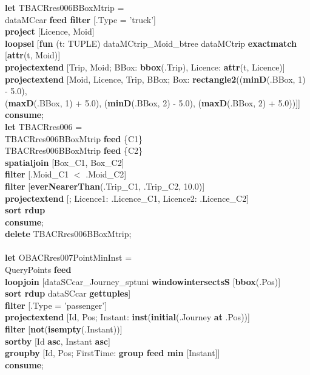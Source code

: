 \documentclass[a4paper]{article}
\newcommand{\op}[1]{\textbf{#1}}
\begin{document}
\begin{scriptsize}
\begin{tabbing}
\op{let} TBACRres006BBoxMtrip =\\
\>dataMCcar \op{feed filter} [.Type = 'truck']\\
\>\op{project} [Licence, Moid]\\
\>\op{loopsel} [\op{fun} (t: TUPLE) dataMCtrip\_Moid\_btree dataMCtrip \op{exactmatch} [\op{attr}(t, Moid)]\\
\>\>\op{projectextend} [Trip, Moid; BBox: \op{bbox}(.Trip), Licence: \op{attr}(t, Licence)]\\
\>\>\op{projectextend} [Moid, Licence, Trip, BBox; Box: \op{rectangle2}((\op{minD}(.BBox, 1) - 5.0),\\
\>\>\>\>(\op{maxD}(.BBox, 1) + 5.0), (\op{minD}(.BBox, 2) - 5.0), (\op{maxD}(.BBox, 2) + 5.0))]]\\
\op{consume};\\
\op{let} TBACRres006 =\\
\>TBACRres006BBoxMtrip \op{feed} \{C1\}\\
\>TBACRres006BBoxMtrip \op{feed} \{C2\}\\
\>\op{spatialjoin} [Box\_C1, Box\_C2]\\
\>\op{filter} [.Moid\_C1 $<$ .Moid\_C2]\\
\>\op{filter} [\op{everNearerThan}(.Trip\_C1, .Trip\_C2, 10.0)]\\
\>\op{projectextend} [; Licence1: .Licence\_C1, Licence2: .Licence\_C2]\\
\>\op{sort rdup}\\
\op{consume};\\
\op{delete} TBACRres006BBoxMtrip;\\
\\
\op{let} OBACRres007PointMinInst = \\
\>QueryPoints \op{feed}\\
\>\op{loopjoin} [dataSCcar\_Journey\_sptuni \op{windowintersectsS} [\op{bbox}(.Pos)]\\
\>\>\op{sort rdup} dataSCcar \op{gettuples}]\\
\>\op{filter} [.Type = 'passenger']\\
\>\op{projectextend} [Id, Pos; Instant: \op{inst}(\op{initial}(.Journey \op{at} .Pos))]\\
\>\op{filter} [\op{not}(\op{isempty}(.Instant))]\\
\>\op{sortby} [Id \op{asc}, Instant \op{asc}]\\
\>\op{groupby} [Id, Pos; FirstTime: \op{group feed min} [Instant]]\\
\op{consume};\\

\end{tabbing}
\end{scriptsize}
\end{document}

